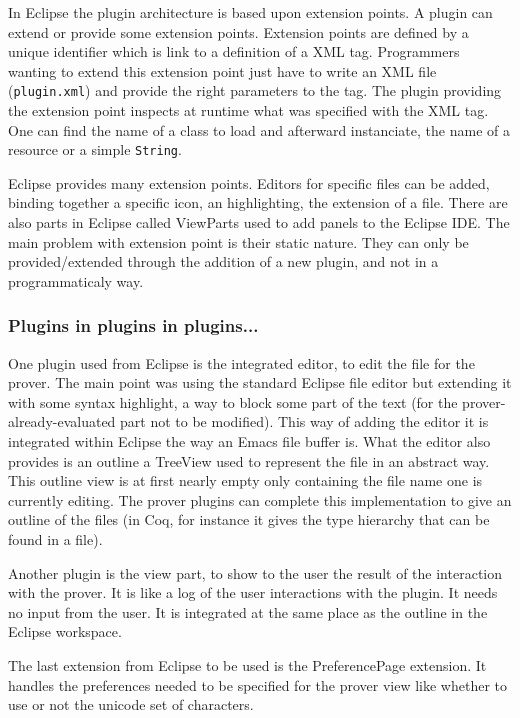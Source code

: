 \documentclass{entcs}
\begin{document}
In Eclipse the plugin architecture is based upon extension points.
A plugin can extend or provide some extension points. 
Extension points are defined by a unique identifier which is link
to a definition of a XML tag. Programmers wanting to extend
this extension point just have to write an XML file ({\tt plugin.xml}) 
and provide the right parameters to the tag.
The plugin providing the extension point inspects at runtime what was 
specified with the XML tag. One can find the name of a class to load
and afterward instanciate, the name of a resource or a simple {\tt String}.

Eclipse provides many extension points. Editors for specific files can be
added, binding together a specific icon, an highlighting, the extension of a
file. There are also parts in Eclipse called ViewParts used to add panels to 
the Eclipse IDE.
The main problem with extension point is their static nature.
They can only be provided/extended through the addition of a
new plugin, and not in a programmaticaly way.
\subsubsection{Plugins in plugins in plugins...}
\label{subsubsec:plug-plug-plug}
One plugin used from Eclipse is the integrated editor, to edit the 
file for the prover. The main point was using the standard Eclipse file editor
but extending it with some syntax highlight, a way to block some part
of the text (for the prover-already-evaluated part not to be modified). This
way of adding the editor it is integrated within Eclipse the way an Emacs 
file buffer is.  What the editor also provides is an outline a TreeView
used to represent the file in an abstract way. This outline view
is at first nearly empty only containing the file name one is currently
editing. The prover plugins can complete this implementation to give
an outline of the files (in Coq, for instance it gives the type
hierarchy that can be found in a file).

Another plugin is the view part, to show to the user the result of the
interaction with the prover. It is like a log of the user interactions
with the plugin. It needs no input from the user. It is integrated
at the same place as the outline in the Eclipse workspace.

The last extension from Eclipse to be used is the PreferencePage extension.
It handles the preferences needed to be specified for the prover view
like whether to use or not the unicode set of characters.
\end{document}
